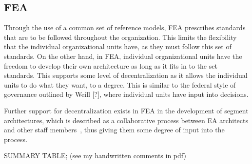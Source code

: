 \subsection{FEA}

Through the use of a common set of reference models, FEA prescribes standards that are to be followed throughout the organization. This limits the flexibility that the individual organizational units have, as they must follow this set of standards. On the other hand, in FEA, individual organizational units have the freedom to develop their own architecture as long as it fits in to the set standards. This supports some level of decentralization as it allows the individual units to do what they want, to a degree. This is similar to the federal style of governance outlined by Weill [?], where individual units have input into decisions. 

Further support for decentralization exists in FEA in the development of segment architectures, which is described as a collaborative process between EA architects and other staff members~\cite{FederalEnterpriseArchitectureProgramManagementOffice2007}, thus giving them some degree of input into the process. 

SUMMARY TABLE;
(see my handwritten comments in pdf)
